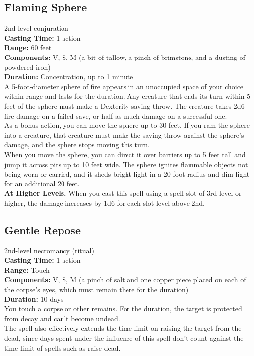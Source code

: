 \documentclass[11pt, A4paper, english]{article}
\begin{document}
		\subsection{Flaming Sphere}
2nd-level conjuration \\
\textbf{Casting Time:} 1 action \\
\textbf{Range:} 60 feet \\
\textbf{Components:} V, S, M (a bit of tallow, a pinch of brimstone, and a dusting of powdered iron) \\
\textbf{Duration:} Concentration, up to 1 minute \\
A 5-foot-diameter sphere of fire appears in an unoccupied space of your choice within range and lasts for the duration. Any creature that ends its turn within 5 feet of the sphere must make a Dexterity saving throw. The creature takes 2d6 fire damage on a failed save, or half as much damage on a successful one. \\
As a bonus action, you can move the sphere up to 30 feet. If you ram the sphere into a creature, that creature must make the saving throw against the sphere’s damage, and the sphere stops moving this turn. \\
When you move the sphere, you can direct it over barriers up to 5 feet tall and jump it across pits up to 10 feet wide. The sphere ignites flammable objects not being worn or carried, and it sheds bright light in a 20-foot radius and dim light for an additional 20 feet. \\
\textbf{At Higher Levels.} When you cast this spell using a spell slot of 3rd level or higher, the damage increases by 1d6 for each slot level above 2nd.

		\subsection{Gentle Repose}
2nd-level necromancy (ritual) \\
\textbf{Casting Time:} 1 action \\
\textbf{Range:} Touch \\
\textbf{Components:} V, S, M (a pinch of salt and one copper piece placed on each of the corpse’s eyes, which must remain there for the duration) \\
\textbf{Duration:} 10 days \\
You touch a corpse or other remains. For the duration, the target is protected from decay and can’t become undead. \\
The spell also effectively extends the time limit on raising the target from the dead, since days spent under the influence of this spell don’t count against the time limit of spells such as raise dead.
\end{document}
